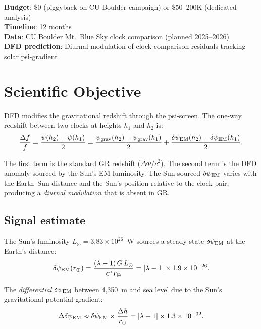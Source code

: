 \documentclass[11pt]{article}
\newcommand{\ee}[1]{\times 10^{#1}}
\newcommand{\dpsi}{\delta\psi}
\begin{document}
\label{sec:clocks}

\begin{tcolorbox}[colback=purple!3!white, colframe=newcolor,
  title=\textbf{NEW PROPOSAL C --- OPTICAL CLOCK ALTITUDE COMPARISON}]
\textbf{Budget}: \$0 (piggyback on CU Boulder campaign) or
\$50--200K (dedicated analysis)\\
\textbf{Timeline}: 12 months\\
\textbf{Data}: CU Boulder Mt.~Blue Sky clock comparison
(planned 2025--2026)\\
\textbf{DFD prediction}: Diurnal modulation of clock comparison
residuals tracking solar psi-gradient
\end{tcolorbox}

\section{Scientific Objective}

DFD modifies the gravitational redshift through the psi-screen.
The one-way redshift between two clocks at heights $h_1$ and $h_2$ is:
\begin{equation}
\frac{\Delta f}{f} = \frac{\psi(h_2) - \psi(h_1)}{2}
= \frac{\psi_{\rm grav}(h_2) - \psi_{\rm grav}(h_1)}{2}
+ \frac{\dpsi_{\rm EM}(h_2) - \dpsi_{\rm EM}(h_1)}{2}.
\end{equation}

The first term is the standard GR redshift ($\Delta\Phi/c^2$).
The second term is the DFD anomaly sourced by the Sun's EM luminosity.
The Sun-sourced $\dpsi_{\rm EM}$ varies with the Earth--Sun distance and
the Sun's position relative to the clock pair, producing a \emph{diurnal
modulation} that is absent in GR.

\subsection{Signal estimate}

The Sun's luminosity $L_\odot = 3.83\ee{26}$~W sources a steady-state
$\dpsi_{\rm EM}$ at the Earth's distance:
\begin{equation}
\dpsi_{\rm EM}(r_\oplus) = \frac{(\lambda-1)\,G\,L_\odot}
{c^5\,r_\oplus}
= |\lambda-1| \times 1.9\ee{-26}.
\end{equation}

The \emph{differential} $\dpsi_{\rm EM}$ between 4,350~m and sea level
due to the Sun's gravitational potential gradient:
\begin{equation}
\Delta\dpsi_{\rm EM} \approx \dpsi_{\rm EM} \times
\frac{\Delta h}{r_\oplus} = |\lambda-1| \times 1.3\ee{-32}.
\end{equation}
\end{document}
